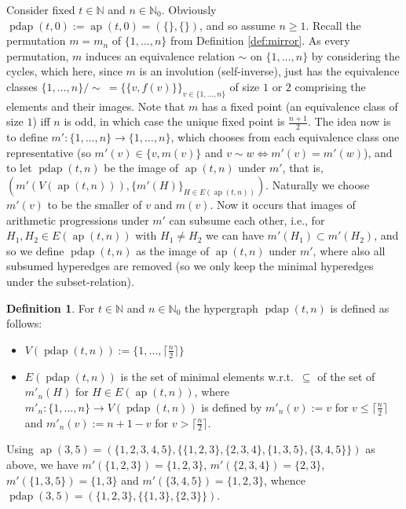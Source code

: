 \documentclass[final,3p,times]{elsarticle}
\theoremstyle{definition}
\newtheorem{defn}{Definition}[section]
\newcommand{\set}[1]{\{#1\}}
\renewcommand{\leq}{\le} %
\newcommand{\NN}{\mathbb{N}}
\newcommand{\NNZ}{\NN_0}
\newcommand{\ceil}[1]{\lceil #1 \rceil}
\DeclareMathOperator{\arithp}{ap}
\DeclareMathOperator{\pdarithp}{pdap}
\begin{document}
Consider fixed $t \in \NN$ and $n \in \NNZ$. Obviously $\pdarithp(t,0) := \arithp(t,0) = (\set{},\set{})$, and so assume $n \geq 1$. Recall the permutation $m = m_n$ of $\set{1,\dots,n}$ from Definition \ref{def:mirror}. As every permutation, $m$ induces an equivalence relation $\sim$ on $\set{1,\dots,n}$ by considering the cycles, which here, since $m$ is an involution (self-inverse), just has the equivalence classes $\set{1,\dots,n} / \!\!\sim \:= \set{\set{v,f(v)}}_{v \in \set{1,\dots,n}}$ of size $1$ or $2$ comprising the elements and their images. Note that $m$ has a fixed point (an equivalence class of size $1$) iff $n$ is odd, in which case the unique fixed point is $\frac{n+1}2$. The idea now is to define $m': \set{1,\dots,n} \rightarrow \set{1,\dots,n}$, which chooses from each equivalence class one representative (so $m'(v) \in \set{v,m(v)}$ and $v \sim w \Leftrightarrow m'(v) = m'(w)$), and to let $\pdarithp(t,n)$ be the image of $\arithp(t,n)$ under $m'$, that is, $(m'(V(\arithp(t,n))),\set{m'(H)}_{H \in E(\arithp(t,n))})$. Naturally we choose $m'(v)$ to be the smaller of $v$ and $m(v)$. Now it occurs that images of arithmetic progressions under $m'$ can subsume each other, i.e., for $H_1, H_2 \in E(\arithp(t,n))$ with $H_1 \ne H_2$ we can have $m'(H_1) \subset m'(H_2)$, and so we define $\pdarithp(t,n)$ as the image of $\arithp(t,n)$ under $m'$, where also all subsumed hyperedges are removed (so we only keep the minimal hyperedges under the subset-relation).

\begin{defn}\label{def:pdarithp}
  For $t \in \NN$ and $n \in \NNZ$ the hypergraph $\pdarithp(t,n)$ is defined as follows:
  \begin{itemize}
  \item $V(\pdarithp(t,n)) := \set{1,\dots,\ceil{\frac n2}}$
  \item $E(\pdarithp(t,n))$ is the set of minimal elements w.r.t.\ $\subseteq$ of the set of $m'_n(H)$ for $H \in E(\arithp(t,n))$, where $m'_n: \set{1,\dots,n} \rightarrow V(\pdarithp(t,n))$ is defined by $m'_n(v) := v$ for $v \leq \ceil{\frac n2}$ and $m'_n(v) := n+1-v$ for $v > \ceil{\frac n2}$.
  \end{itemize}
\end{defn}
Using $\arithp(3,5) = (\set{1,2,3,4,5},\set{\set{1,2,3},\set{2,3,4},\set{1,3,5},\set{3,4,5}})$ as above, we have $m'(\set{1,2,3}) = \set{1,2,3}$, $m'(\set{2,3,4}) = \set{2,3}$, $m'(\set{1,3,5}) = \set{1,3}$ and $m'(\set{3,4,5}) = \set{1,2,3}$, whence $\pdarithp(3,5) = (\set{1,2,3}, \set{\set{1,3},\set{2,3}})$.
\end{document}
